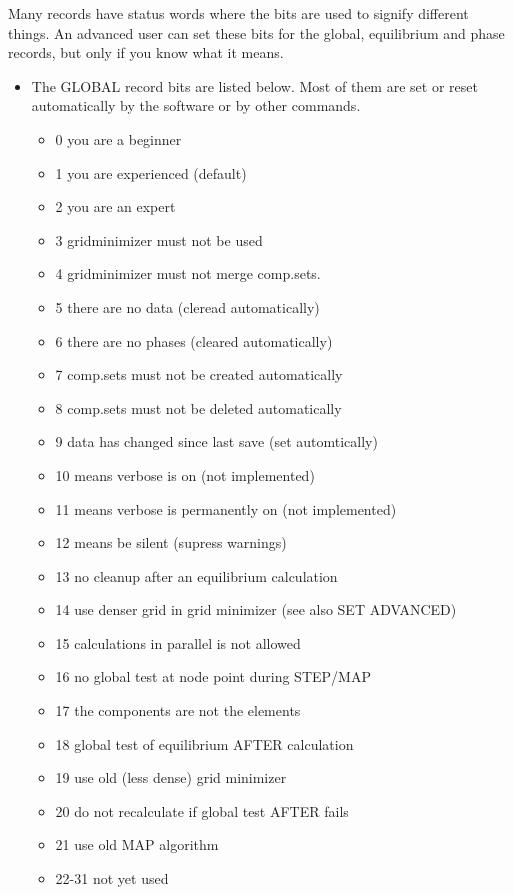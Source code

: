 \documentclass[11pt]{article}
\begin{document}
Many records have status words where the bits are used to signify
different things.  An advanced user can set these bits for the global,
equilibrium and phase records, but only if you know what it means.
\begin{itemize}
\item The GLOBAL record bits are listed below.  Most of them are
  set or reset automatically by the software or by other commands.
  \begin{itemize}
  \item   0  you are a beginner
  \item   1  you are experienced (default)
  \item   2  you are an expert
  \item   3  gridminimizer must not be used
  \item   4  gridminimizer must not merge comp.sets.
  \item   5  there are no data (cleread automatically)
  \item   6  there are no phases (cleared automatically)
  \item   7  comp.sets must not be created automatically
  \item   8  comp.sets must not be deleted automatically
  \item   9  data has changed since last save (set automtically)
  \item  10  means verbose is on (not implemented)
  \item  11  means verbose is permanently on (not implemented)
  \item  12  means be silent (supress warnings)
  \item  13  no cleanup after an equilibrium calculation
  \item  14  use denser grid in grid minimizer (see also SET ADVANCED)
  \item  15  calculations in parallel is not allowed
  \item  16  no global test at node point during STEP/MAP
  \item  17  the components are not the elements
  \item  18  global test of equilibrium AFTER calculation
  \item  19  use old (less dense) grid minimizer
  \item  20  do not recalculate if global test AFTER fails
  \item  21  use old MAP algorithm
  \item  22-31 not yet used
  \end{itemize}

\end{itemize}
\end{document}
